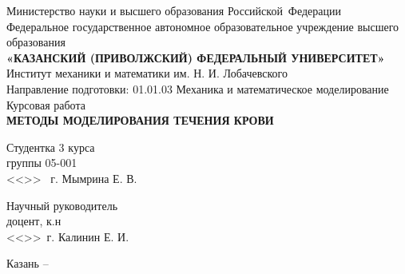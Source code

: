 \begin{titlepage}
\begin{center}

\hfill \break

\large{Министерство науки и высшего образования Российской~Федерации}\\
\footnotesize{Федеральное государственное автономное образовательное учреждение высшего образования}\\ 
\small{\textbf{«КАЗАНСКИЙ (ПРИВОЛЖСКИЙ) ФЕДЕРАЛЬНЫЙ УНИВЕРСИТЕТ»}}\\

\hfill \break
\normalsize{Институт механики и математики им. Н. И. Лобачевского}\\

\hfill \break
\normalsize{Направление подготовки: 01.01.03 Механика и математическое моделирование}\\

\vspace{25mm}
\large{Курсовая работа}\\
\large{\textbf{МЕТОДЫ МОДЕЛИРОВАНИЯ ТЕЧЕНИЯ КРОВИ}}\\
\end{center}

\vspace{20mm}
\noindent
Студентка 3 курса \\
группы 05-001 \\
<<\underline{\hspace{0,75cm}}>> \underline{\hspace{2cm}}\the\year~г. \hspace{9cm} Мымрина Е. В.

\hfill \break
Научный руководитель \\
доцент, к.н\\
<<\underline{\hspace{0,75cm}}>>\underline{\hspace{2cm}}\the\year~г. \hspace{9.1cm} Калинин Е. И.

\vspace{\fill}

\begin{center}
    Казань -- \the\year
\end{center}
\thispagestyle{empty}

\end{titlepage}
